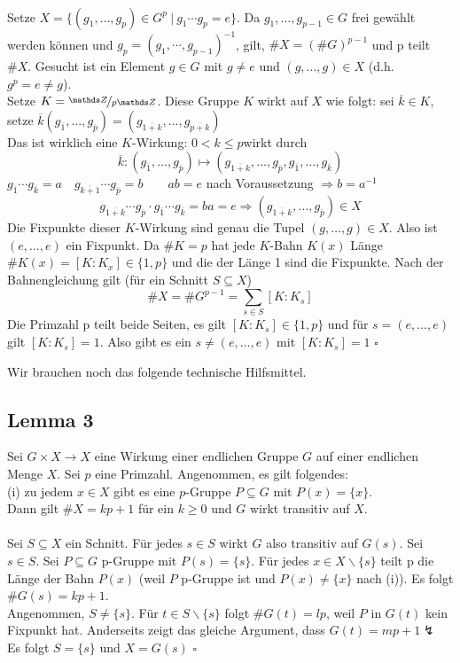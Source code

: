 \\
Setze $X=\{ (g_1,\dots,g_p)\in G^p~|~g_1\cdots g_p=e \}$. Da $g_1,\dots,g_{p-1}\in G$ frei gewählt werden können und $g_p=(g_1,\cdots,g_{p-1})^{-1}$, gilt, $\#X=(\#G)^{p-1}$ und p teilt $\#X$. Gesucht ist ein Element $g\in G$ mit $g\not= e$ und $(g,\dots,g)\in X$ (d.h. $g^p=e\not=g$).\\
Setze $K=\nicefrac{\Z}{p\Z}$. Diese Gruppe $K$ wirkt auf $X$ wie folgt: sei $\overline{k}\in K$, setze $\overline{k}(g_{\overline{1}},\dots,g_{\overline{p}})=(g_{\overline{1+k}},\dots,g_{\overline{p+k}})$\\
Das ist wirklich eine $K$-Wirkung: $0<k\le p$wirkt durch \[\overline{k}:(g_{\overline{1}},\dots,g_{\overline{p}}) \mapsto (g_{\overline{1+k}},\dots,g_{\overline{p}},g_{\overline{1}},\dots,g_{\overline{k}}) \] 
$g_{\overline{1}}\cdots g_{\overline{k}}=a\quad g_{\overline{k+1}}\cdots g_{\overline{p}}=b\qquad ab=e$ nach Voraussetzung $\Rightarrow b=a^{-1}$
\[g_{\overline{1+k}}\cdots g_{\overline{p}}\cdot g_{\overline{1}}\cdots g_{\overline{k}} =ba=e \Rightarrow (g_{\overline{1+k}},\dots,g_{\overline{p}})\in X \]
Die Fixpunkte dieser $K$-Wirkung sind genau die Tupel $(g,\dots,g)\in X$. Also ist $(e,\dots,e)$ ein Fixpunkt. Da $\#K=p$ hat jede $K$-Bahn $K(x)$ Länge $\#K(x)=[K:K_x]\in \{1,p\}$ und die der Länge 1 sind die Fixpunkte. Nach der Bahnengleichung gilt (für ein Schnitt $S\subseteq X$) \[\#X=\#G^{p-1}=\sum_{s\in S}[K:K_s] \]
Die Primzahl p teilt beide Seiten, es gilt $[K:K_s]\in \{1,p\}$ und für $s=(e,\dots,e)$ gilt $[K:K_s]=1$. Also gibt es ein $s\not=(e,\dots,e)$ mit $[K:K_s]=1$
\hfill $\square$
\newpage

Wir brauchen noch das folgende technische Hilfsmittel.

\subsection{Lemma 3}
\label{sub:lemma_3}
Sei $G\times X\to X$ eine Wirkung einer endlichen Gruppe $G$ auf einer endlichen Menge $X$. Sei $p$ eine Primzahl. Angenommen, es gilt folgendes:\\
(i) zu jedem $x\in X$ gibt es eine $p$-Gruppe $P\subseteq G$ mit $P(x)=\{x\}$.\\
Dann gilt $\#X=kp+1$ für ein $k\ge0$ und $G$ wirkt transitiv auf $X$.\\

\\
Sei $S\subseteq X$ ein Schnitt. Für jedes $s\in S$ wirkt $G$ also transitiv auf $G(s)$. Sei $s\in S$. Sei $P\subseteq G$ p-Gruppe mit $P(s)=\{s\}$. Für jedes $x\in X\backslash\{s\}$ teilt p die Länge der Bahn $P(x)$ \big(weil $P$ p-Gruppe ist und $P(x)\not=\{x\}$ nach (i)\big). Es folgt $\#G(s)=kp+1$.\\
Angenommen, $S\not=\{s\}$. Für $t\in S\backslash\{s\}$ folgt $\#G(t)=lp$, weil $P$ in $G(t)$ kein Fixpunkt hat. Anderseits zeigt das gleiche Argument, dass $G(t)=mp+1\lightning$\\
Es folgt $S=\{s\}$ und $X=G(s)$
\hfill $\square$
\\

